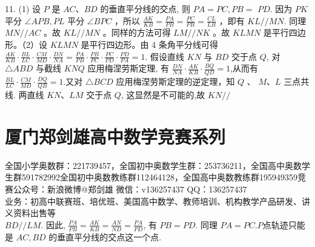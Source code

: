 \documentclass[10pt]{article}
\begin{document}
11. (1) 设 $P$ 是 $A C 、 B D$ 的垂直平分线的交点, 则 $P A=P C, P B=$ $P D$. 因为 $P K$ 平分 $\angle A P B, P L$ 平分 $\angle B P C$ ，所以 $\frac{A K}{K B}=\frac{P A}{P B}=\frac{P C}{P B}=\frac{C L}{L B}$ ，即有 $K L / / M N$. 同理 $M N / / A C$ 。故 $K L / / M N$ 。同样的方法可得 $L M / / N K$ 。故 $K L M N$ 是平行四边形。（2）设 $K L M N$ 是平行四边形。由 4 条角平分线可得 $\frac{A K}{K B} \cdot \frac{B L}{L C} \cdot \frac{C M}{M D} \cdot \frac{D N}{N A}=\frac{P A}{P B} \cdot \frac{P B}{P C} \cdot \frac{P C}{P D} \cdot \frac{P D}{P A}=1$. 假设直线 $K N$ 与 $B D$ 交于点 $Q$, 对 $\triangle A B D$ 与截线 $K N Q$ 应用梅涅劳斯定理, 有 $\frac{D N}{N A} \cdot \frac{A K}{K B} \cdot \frac{B Q}{Q D}=1$,从而有 $\frac{B L}{L C} \cdot \frac{C M}{M D} \cdot \frac{D Q}{Q B}=1$.又对 $\triangle B C D$ 应用梅涅劳斯定理的逆定理，知 $Q$ 、 $M 、 L$ 三点共线. 两直线 $K N 、 L M$ 交于点 $Q$, 这显然是不可能的,故 $K N / /$

\section*{厦门郑剑雄高中数学竞赛系列}
全国小学奥数群：221739457，全国初中奥数学生群：253736211，全国高中奥数学生群591782992全国初中奥数教练群112464128，全国高中奥数教练群195949359竞赛公众号：新浪微博@郑剑雄 微信：v136257437 QQ：136257437\\
业务：初高中联赛班、培优班、美国高中数学、教师培训、机构教学产品研发、讲义资料出售等\\
$B D / / L M$. 因此, $\frac{P A}{P B}=\frac{A K}{K B}=\frac{A N}{N D}=\frac{P A}{P D}$, 有 $P B=P D$. 同理 $P A=P C . P$点轨迹只能是 $A C, B D$ 的垂直平分线的交点这一个点.
\end{document}
